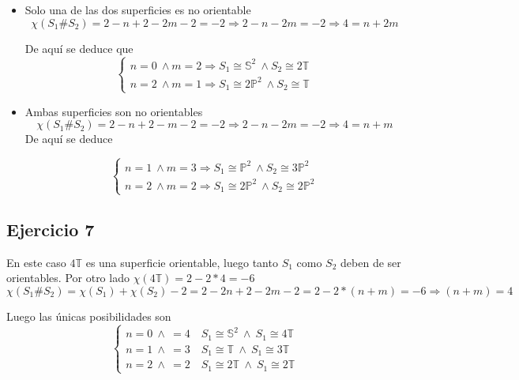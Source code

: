 \documentclass{article}
\begin{document}
\begin{itemize}
\item Solo una de las dos superficies es no orientable
\begin{equation*}
\chi(S_1\#S_2)=2-n+2-2m-2=-2\Rightarrow 2-n-2m=-2\Rightarrow 4=n+2m
\end{equation*}

De aquí se deduce que
\begin{equation*}
\left\lbrace\begin{array}{c}
n=0\:\wedge m=2 \Rightarrow S_1\cong \mathbb{S}^2\:\wedge S_2\cong 2\mathbb{T}\\
n=2\:\wedge m=1 \Rightarrow S_1\cong 2\mathbb{P}^2\:\wedge S_2\cong \mathbb{T}
\end{array}\right.
\end{equation*}

\item Ambas superficies son no orientables
\begin{equation*}
\chi(S_1\#S_2)=2-n+2-m-2=-2\Rightarrow 2-n-2m=-2\Rightarrow 4=n+m
\end{equation*}
De aquí se deduce

\begin{equation*}
\left\lbrace\begin{array}{c}
n=1\:\wedge m=3 \Rightarrow S_1\cong \mathbb{P}^2\:\wedge S_2\cong 3\mathbb{P}^2\\
n=2\:\wedge m=2 \Rightarrow S_1\cong 2\mathbb{P}^2\:\wedge S_2\cong 2\mathbb{P}^2
\end{array}\right.
\end{equation*}

\end{itemize}

\subsection{Ejercicio 7}
En este caso $4\mathbb{T}$ es una superficie orientable, luego tanto $S_1$ como $S_2$ deben de ser orientables. Por otro lado $\chi(4\mathbb{T})=2-2*4=-6$
\begin{equation*}
\chi(S_1\#S_2)=\chi(S_1)+\chi(S_2)-2=2-2n+2-2m-2=2-2*(n+m)=-6\Rightarrow (n+m)=4
\end{equation*}

Luego las únicas posibilidades son
\begin{equation*}
\left\lbrace\begin{array}{c}
n=0\:\wedge\:=4\quad S_1\cong \mathbb{S}^2\:\wedge\:S_1\cong 4\mathbb{T}\\
n=1\:\wedge\:=3\quad S_1\cong \mathbb{T}\:\wedge\:S_1\cong 3\mathbb{T}\\
n=2\:\wedge\:=2\quad S_1\cong 2\mathbb{T}\:\wedge\:S_1\cong 2\mathbb{T}
\end{array}\right.
\end{equation*}
\end{document}
